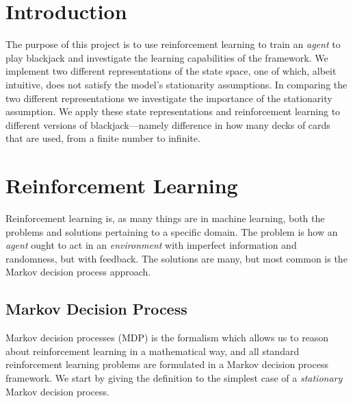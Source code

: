 



\section{Introduction}

The purpose of this project is to use reinforcement learning to train an \textit{agent} to play blackjack and investigate the learning capabilities of the framework. 
We implement two different representations of the state space, one of which, albeit intuitive, does not satisfy the model's stationarity assumptions. In comparing the two different representations we investigate the importance of the stationarity assumption. We apply these state representations and reinforcement learning to different versions of blackjack---namely difference in how many decks of cards that are used, from a finite number to infinite.


\section{Reinforcement Learning}
Reinforcement learning is, as many things are in machine learning, both the problems and solutions pertaining to a specific domain. The problem is how an \textit{agent} ought to act in an \textit{environment} with imperfect information and randomness, but with feedback. The solutions are many, but most common is the Markov decision process approach.
 
\subsection{Markov Decision Process} \label{sec:MDP}
Markov decision processes (MDP) is the formalism  which allows us to reason about reinforcement learning in a mathematical way, and all standard reinforcement learning problems are formulated in a Markov decision process framework. We start by giving the definition to the simplest case of a \textit{stationary} Markov decision process.

